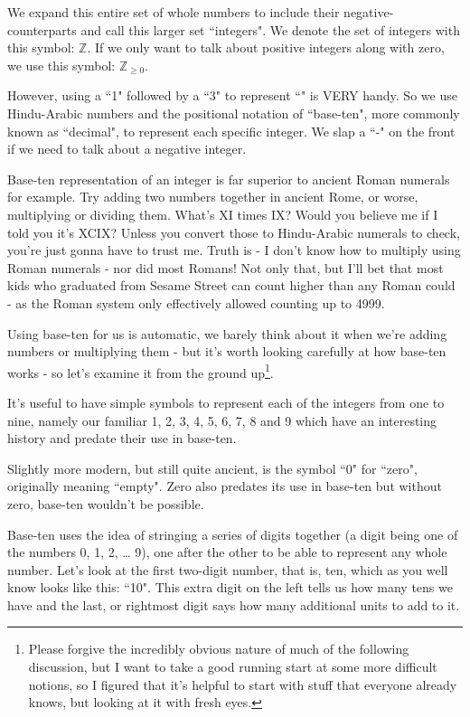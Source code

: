 \documentclass{article}
\begin{document}
We expand this entire set of whole numbers to include their
negative-counterparts and call this larger set ``integers".
We denote the set of integers with this symbol: $\mathbb{Z}$.
If we only want to talk about positive integers along with zero,
we use this symbol: $\mathbb{Z}_{\ge 0}$.

However, using a ``1" followed by a ``3" to represent
``\faApple{}\faApple{}\faApple{}\faApple{}\faApple{}\faApple{}\faApple{}\faApple{}\faApple{}\faApple{}\faApple{}\faApple{}\faApple{}"
is VERY handy. So we use Hindu-Arabic numbers and the positional notation of ``base-ten",
more commonly known as ``decimal", to represent each specific integer.
We slap a ``-" on the front if we need to talk about a negative integer.

Base-ten representation of an integer is far superior to ancient Roman numerals for example.
Try adding two numbers together in ancient Rome, or worse,
multiplying or dividing them.
What's XI times IX? Would you believe me if I told
you it's XCIX? Unless you convert those to Hindu-Arabic numerals to check,
you're just gonna have to trust me.
Truth is - I don't know how to multiply using Roman
numerals - nor did most Romans! Not only that,
but I'll bet that most kids who graduated from Sesame Street
can count higher than any Roman could - as the
Roman system only effectively allowed counting up to 4999.

Using base-ten for us is automatic,
we barely think about it when we're adding numbers or multiplying
them - but it's worth looking carefully at how base-ten
works - so let's examine it from the ground up\footnote{Please forgive the incredibly obvious nature of much
of the following discussion, but I want to take a good running start
at some more difficult notions, so I figured that it's helpful
to start with stuff that everyone already knows, but looking at it with fresh eyes.}.

It's useful to have simple symbols to represent each of the integers from one to nine,
namely our familiar 1, 2, 3, 4, 5, 6, 7, 8 and 9
which have an interesting history and predate their use in base-ten.

Slightly more modern, but still quite ancient,
is the symbol ``0" for ``zero", originally meaning ``empty".
Zero also predates its use in base-ten but without zero,
base-ten wouldn't be possible.

Base-ten uses the idea of stringing a series of digits together
(a digit being one of the numbers 0, 1, 2, \dots{} 9),
one after the other to be able to represent any whole number.
Let's look at the first two-digit number, that is, ten,
which as you well know looks like this: ``10".
This extra digit on the left tells us how many tens we have and the last,
or rightmost digit says how many additional units to add to it.
\end{document}
